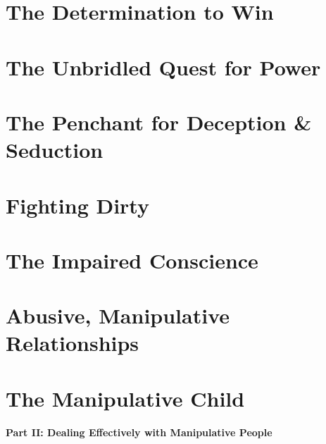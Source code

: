 \documentclass{article}
\numberwithin{equation}{section}
\begin{document}
\section{The Determination to Win}


\section{The Unbridled Quest for Power}


\section{The Penchant for Deception \& Seduction}


\section{Fighting Dirty}


\section{The Impaired Conscience}


\section{Abusive, Manipulative Relationships}


\section{The Manipulative Child}


\begin{center}\Large\bf
	Part II: Dealing Effectively with Manipulative People
\end{center}
\end{document}
